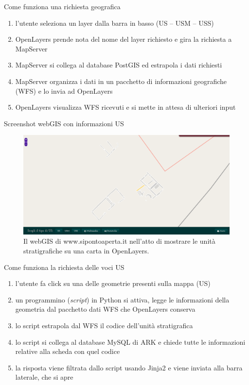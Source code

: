 \documentclass{beamer}
\begin{document}
		\begin{frame}{Come funziona una richiesta geografica}
			\begin{enumerate}
				\item l'utente seleziona un layer dalla barra in basso (US -- USM -- USS)
				\item OpenLayers prende nota del nome del layer richiesto e gira la richiesta a MapServer
				\item MapServer si collega al database PostGIS ed estrapola i dati richiesti
				\item MapServer organizza i dati in un pacchetto di informazioni geografiche (WFS) e lo invia ad OpenLayers
				\item OpenLayers visualizza WFS ricevuti e si mette in attesa di ulteriori input
			\end{enumerate}
		\end{frame}

		\begin{frame}{Screenshot webGIS con informazioni US}
			\begin{figure}[]
				\begin{center}
					\includegraphics[width=1\linewidth]{screen_us}
				\end{center}
				\caption{Il webGIS di www.sipontoaperta.it nell'atto di mostrare le unità stratigrafiche su una carta in OpenLayers.}
				\label{fig:webgis_plain}
			\end{figure}
		\end{frame}

		\begin{frame}{Come funziona la richiesta delle voci US}
			\begin{enumerate}
				\item l'utente fa click su una delle geometrie presenti sulla mappa (US)
				\item un programmino (\emph{script}) in Python si attiva, legge le informazioni della geometria dal pacchetto dati WFS che OpenLayers conserva
				\item lo script estrapola dal WFS il codice dell'unità stratigrafica
				\item lo script si collega al database MySQL di ARK e chiede tutte le informazioni relative alla scheda con quel codice
				\item la risposta viene filtrata dallo script usando Jinja2 e viene inviata alla barra laterale, che si apre
			\end{enumerate}
		\end{frame}
\end{document}
